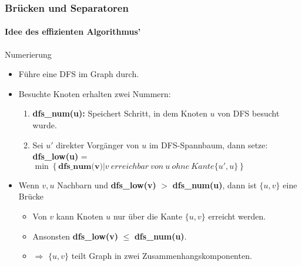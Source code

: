 \begin{frame}
\frametitle{Brücken und Separatoren}
\framesubtitle{Idee des effizienten Algorithmus'}
\begin{KITinfoblock}{Numerierung}
	\begin{itemize}
		\item Führe eine DFS im Graph durch.
		\item Besuchte Knoten erhalten zwei Nummern:
		
		\begin{enumerate}
			\item \textbf{dfs\_num(u):} Speichert Schritt, in dem Knoten $u$ von DFS besucht wurde.
			\item  Sei $u'$ direkter Vorgänger von $u$ im DFS-Spannbaum, dann setze: \newline \textbf{dfs\_low(u)} = $\min \left \{\textbf{dfs\_num(v)} | v \ erreichbar \ von \ u \ ohne \ Kante \{u',u\} \right \}$ 
		\end{enumerate}
	\end{itemize}
\end{KITinfoblock}
\pause
			\begin{itemize}	

		\item Wenn $v,u$ Nachbarn und \textbf{dfs\_low(v)} $>$ \textbf{dfs\_num(u)}, dann ist $\{u,v\}$ eine Brücke
		\begin{itemize}
			\item Von $v$ kann Knoten $u$ nur über die Kante $\{u,v\}$ erreicht werden.
			\item Ansonsten \textbf{dfs\_low(v)} $\leq$ \textbf{dfs\_num(u)}.
			\item $\Rightarrow$ $\{u,v\}$ teilt Graph in zwei Zusammenhangskomponenten.
		\end{itemize} 
	\end{itemize}
\end{frame}
